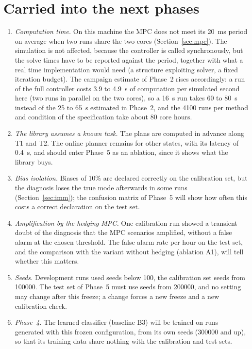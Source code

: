 \documentclass[10pt]{article}
\begin{document}
\section{Carried into the next phases}\label{sec:next}

\begin{enumerate}
\item \emph{Computation time.} On this machine the MPC does not meet its 20~ms period on average when two runs share the two cores (Section~\ref{sec:mpc}). The simulation is not affected, because the controller is called synchronously, but the solve times have to be reported against the period, together with what a real time implementation would need (a structure exploiting solver, a fixed iteration budget). The campaign estimate of Phase~2 rises accordingly: a run of the full controller costs 3.9 to 4.9~s of computation per simulated second here (two runs in parallel on the two cores), so a 16~s run takes 60 to 80~s instead of the 25 to 65~s estimated in Phase~2, and the 4100 runs per method and condition of the specification take about 80 core hours.
\item \emph{The library assumes a known task.} The plans are computed in advance along T1 and T2. The online planner remains for other states, with its latency of 0.4~s, and should enter Phase~5 as an ablation, since it shows what the library buys.
\item \emph{Bias isolation.} Biases of 10\% are declared correctly on the calibration set, but the diagnosis loses the true mode afterwards in some runs (Section~\ref{sec:imm}); the confusion matrix of Phase~5 will show how often this costs a correct declaration on the test set.
\item \emph{Amplification by the hedging MPC.} One calibration run showed a transient doubt of the diagnosis that the MPC scenarios amplified, without a false alarm at the chosen threshold. The false alarm rate per hour on the test set, and the comparison with the variant without hedging (ablation A1), will tell whether this matters.
\item \emph{Seeds.} Development runs used seeds below 100, the calibration set seeds from 100000. The test set of Phase~5 must use seeds from 200000, and no setting may change after this freeze; a change forces a new freeze and a new calibration check.
\item \emph{Phase~4.} The learned classifier (baseline B3) will be trained on runs generated with this frozen configuration, from its own seeds (300000 and up), so that its training data share nothing with the calibration and test sets.
\end{enumerate}



\end{document}
